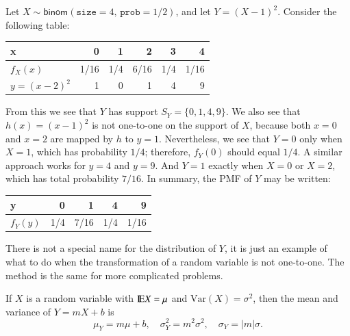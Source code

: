 \documentclass[captions=tableheading]{scrbook}
\begin{document}
\begin{example}
Let \(X\sim\mathsf{binom}(\mathtt{size}=4,\,\mathtt{prob}=1/2)\), and let \(Y=(X-1)^{2}\). Consider the following table:


\begin{center}
\begin{tabular}{lrrrrr}
 x                &     0  &    1  &     2  &    3  &     4  \\
\hline
 \(f_{X}(x)\)     &  1/16  &  1/4  &  6/16  &  1/4  &  1/16  \\
\hline
 \(y=(x-2)^{2}\)  &     1  &    0  &     1  &    4  &     9  \\
\end{tabular}
\end{center}



From this we see that \(Y\) has support \(S_{Y}=\{0,1,4,9\}\). We also see that \(h(x)=(x-1)^{2}\) is not one-to-one on the support of \(X\), because both \(x=0\) and \(x=2\) are mapped by \(h\) to \(y=1\). Nevertheless, we see that \(Y=0\) only when \(X=1\), which has probability \(1/4\); therefore, \(f_{Y}(0)\) should equal \(1/4\). A similar approach works for \(y=4\) and \(y=9\). And \(Y=1\) exactly when \(X=0\) or \(X=2\), which has total probability \(7/16\). In summary, the PMF of \(Y\) may be written:


\begin{center}
\begin{tabular}{lrrrr}
 y             &    0  &     1  &    4  &     9  \\
\hline
 \(f_{Y}(y)\)  &  1/4  &  7/16  &  1/4  &  1/16  \\
\end{tabular}
\end{center}



There is not a special name for the distribution of \(Y\), it is just an example of what to do when the transformation of a random variable is not one-to-one. The method is the same for more complicated problems.

\end{example}


\begin{prop}
If \(X\) is a random variable with \(\mathrm{I\hspace{-1.5pt}E} X=\mu\) and \(\mbox{Var}(X)=\sigma^{2}\), then the mean and variance of \(Y=mX+b\) is
\begin{equation}
\mu_{Y}=m\mu+b,\quad\sigma_{Y}^{2}=m^{2}\sigma^{2},\quad\sigma_{Y}=|m|\sigma.
\end{equation}
\end{prop}
\end{document}
